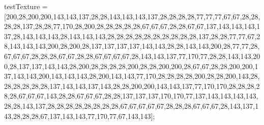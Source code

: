 testTexture = [200,28,200,200,143,143,137,28,28,143,143,143,137,28,28,28,28,77,77,77,67,67,28,28,28,28,137,28,28,77,170,28,200,28,28,28,28,28,67,67,67,28,28,67,67,137,143,143,143,137,28,143,143,143,28,143,143,143,28,28,28,28,28,28,28,28,28,28,137,28,28,77,77,67,28,143,143,143,200,28,200,28,137,137,137,137,143,143,28,28,143,143,200,28,77,77,28,67,67,67,28,28,28,67,67,28,28,67,67,67,67,28,143,143,137,77,170,77,28,28,143,143,200,28,137,137,143,143,28,200,28,28,28,28,200,28,28,200,200,28,67,67,28,28,200,200,137,143,143,200,143,143,143,28,200,143,143,77,170,28,28,28,28,200,28,28,200,143,28,28,28,28,28,28,137,143,143,137,143,28,28,200,200,143,143,137,77,170,170,28,28,28,28,28,67,67,67,143,28,28,67,67,67,28,28,137,137,137,170,170,77,137,143,143,143,143,28,28,143,137,28,28,28,28,28,28,28,28,67,67,67,67,67,28,28,28,67,67,67,28,143,137,143,28,28,28,67,137,143,143,77,170,77,67,143,143];

